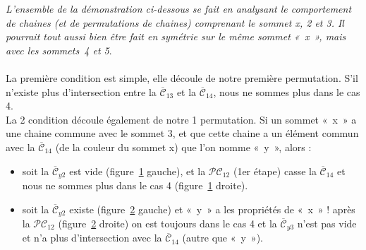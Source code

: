 \begin{adjustwidth}{3.5em}{0pt}
\begin{description}
\textit{L'ensemble de la démonstration ci-dessous se fait en analysant le comportement de chaines (et de permutations de chaines) comprenant le sommet x, 2 et 3. Il pourrait tout aussi bien être fait en symétrie sur le même sommet «~x~», mais avec les sommets~4 et 5}.
\\
\\
La première condition est simple, elle découle de notre première permutation. S'il n'existe plus d'intersection entre la  $\overline{\mathcal{C}}_{13}$ et la  $\overline{\mathcal{C}}_{14}$, nous ne sommes plus dans le cas 4.\\
La 2 condition découle également de notre 1 permutation. Si un sommet «~x~» a une chaine commune avec le sommet 3, et que cette chaine a un élément commun avec la  $\overline{\mathcal{C}}_{14}$ (de la couleur du sommet x) que l'on nomme «~y~», alors :
\begin{itemize}[label=--]
	\item
soit la  $\overline{\mathcal{C}}_{y2}$ est vide (figure~\ref{fig:cas4_etape1_6} gauche), et la  $\mathcal{PC}_{12}$ (1er étape) casse la  $\overline{\mathcal{C}}_{14}$ et nous ne sommes plus dans le cas 4 (figure~\ref{fig:cas4_etape1_6} droite). 
\begin{figure}[!ht]\centering
	\begin{changemargin}{0cm}{-3cm}
		\begin{center}
			
			\hspace{15pt}
			
		\end{center}
	\end{changemargin}
	\begin{changemargin}{3cm}{0cm}
	\caption{}\label{fig:cas4_etape1_6}
	\end{changemargin}
\end{figure}	
\FloatBarrier
	\item
soit la $\overline{\mathcal{C}}_{y2}$ existe (figure~\ref{fig:cas4_etape1_7} gauche) et «~y~» a les propriétés de «~x~» ! après la $\mathcal{PC}_{12}$ (figure~\ref{fig:cas4_etape1_7} droite) on est toujours dans le cas 4 et la $\overline{\mathcal{C}}_{y3}$ n'est pas vide et n'a plus d'intersection avec la $\overline{\mathcal{C}}_{14}$ (autre que «~y~»).
\begin{figure}[!ht]\centering
	\begin{changemargin}{0cm}{-3cm}
		\begin{center}
			
			\hspace{15pt}
			
		\end{center}
	\end{changemargin}
	\begin{changemargin}{3cm}{0cm}
	\caption{}\label{fig:cas4_etape1_7}
	\end{changemargin}
\end{figure}	
\FloatBarrier

\end{itemize}
\end{description}
\end{adjustwidth}

